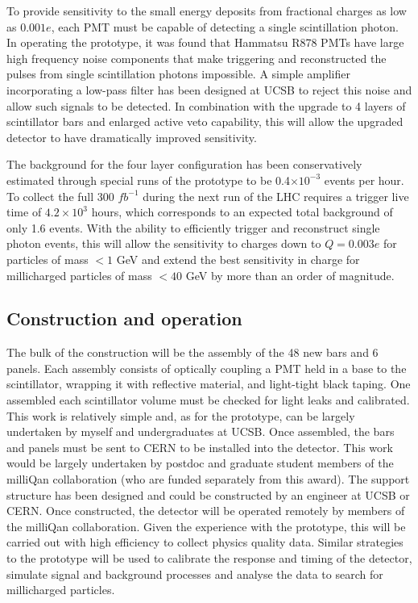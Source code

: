 \documentclass[11pt]{article}
\theoremstyle{plain} \numberwithin{equation}{section}
\theoremstyle{definition}
\begin{document}
To provide sensitivity to the small energy deposits from fractional charges as low as $0.001 e$,
each PMT must be capable of detecting a single scintillation photon.
In operating the prototype, it was found that Hammatsu R878 PMTs have large high frequency noise components
that make triggering and reconstructed the pulses from single scintillation photons impossible.
A simple amplifier incorporating a low-pass filter has been designed at UCSB to reject this noise and
allow such signals to be detected. In combination with the upgrade to 4 layers of scintillator bars
and enlarged active veto capability, this will allow the upgraded detector to have dramatically improved sensitivity.

The background for the four layer configuration has been conservatively estimated
through special runs of the prototype to be 0.4$\times10^{-3}$ events per hour. 
To collect the full 300 $fb^{-1}$ during the next run of the LHC 
requires a trigger live time of $4.2\times 10^3$ hours, which corresponds 
to an expected total background of only 1.6 events. With the ability to efficiently trigger
and reconstruct single photon events, this will allow the sensitivity to charges down to $Q=0.003 e$ for particles of
mass $< 1$ GeV and extend the best sensitivity in charge for millicharged particles of mass $< 40$ GeV
by more than an order of magnitude.

\subsection*{Construction and operation}

The bulk of the construction will be the assembly of the 48 new bars and 6 panels.
Each assembly consists of optically coupling a PMT held in a base
to the scintillator, wrapping it with reflective material, and light-tight black
taping. One assembled each scintillator volume must be checked for light leaks and calibrated.
This work is relatively simple and, as for the prototype, can be largely undertaken
by myself and undergraduates at UCSB. Once assembled, the bars and panels
must be sent to CERN to be installed into the detector. This work would be largely 
undertaken by postdoc and graduate student members of the milliQan collaboration 
(who are funded separately from this award). The support structure has been designed and could be 
constructed by an engineer at UCSB or CERN. Once constructed, the detector will be operated
remotely by members of the milliQan collaboration. Given the experience with the
prototype, this will be carried out with high efficiency to collect physics quality
data. Similar strategies to the prototype will be used to calibrate the response and timing of the 
detector, simulate signal and background processes and analyse the data to 
search for millicharged particles.
\end{document}
